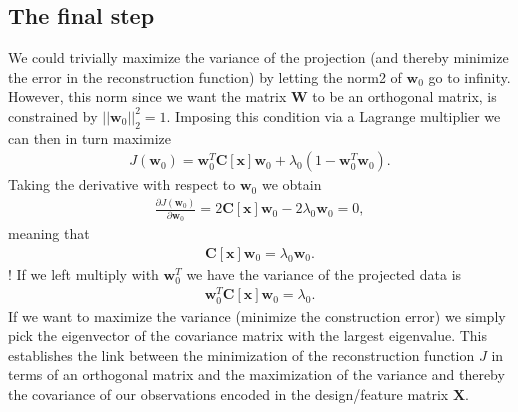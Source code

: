 \documentclass[letterpaper,10pt,english]{sphinxmanual}
\begin{document}
\subsection{The final step}
\label{\detokenize{chapter8:the-final-step}}
We could trivially maximize the variance of the projection (and
thereby minimize the error in the reconstruction function) by letting
the norm\sphinxhyphen{}2 of \(\boldsymbol{w}_0\) go to infinity. However, this norm since we
want the matrix \(\boldsymbol{W}\) to be an orthogonal matrix, is constrained by
\(\vert\vert \boldsymbol{w}_0 \vert\vert_2^2=1\). Imposing this condition via a
Lagrange multiplier we can then in turn maximize
\begin{equation*}
\begin{split}
J(\boldsymbol{w}_0)= \boldsymbol{w}_0^T\boldsymbol{C}[\boldsymbol{x}]\boldsymbol{w}_0+\lambda_0(1-\boldsymbol{w}_0^T\boldsymbol{w}_0).
\end{split}
\end{equation*}
Taking the derivative with respect to \(\boldsymbol{w}_0\) we obtain
\begin{equation*}
\begin{split}
\frac{\partial J(\boldsymbol{w}_0)}{\partial \boldsymbol{w}_0}= 2\boldsymbol{C}[\boldsymbol{x}]\boldsymbol{w}_0-2\lambda_0\boldsymbol{w}_0=0,
\end{split}
\end{equation*}
meaning that
\begin{equation*}
\begin{split}
\boldsymbol{C}[\boldsymbol{x}]\boldsymbol{w}_0=\lambda_0\boldsymbol{w}_0.
\end{split}
\end{equation*}
! If we left multiply with \(\boldsymbol{w}_0^T\) we have the variance of the projected data is
\begin{equation*}
\begin{split}
\boldsymbol{w}_0^T\boldsymbol{C}[\boldsymbol{x}]\boldsymbol{w}_0=\lambda_0.
\end{split}
\end{equation*}
If we want to maximize the variance (minimize the construction error)
we simply pick the eigenvector of the covariance matrix with the
largest eigenvalue. This establishes the link between the minimization
of the reconstruction function \(J\) in terms of an orthogonal matrix
and the maximization of the variance and thereby the covariance of our
observations encoded in the design/feature matrix \(\boldsymbol{X}\).
\end{document}

